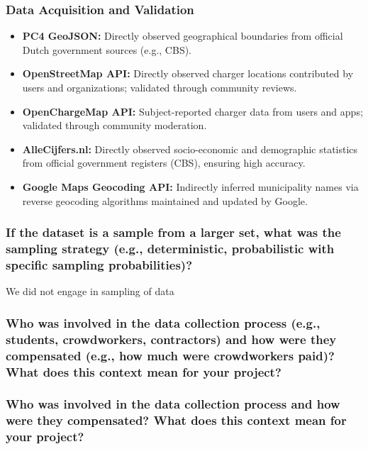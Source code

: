 \documentclass{article}
\newcommand{\question}[1]{#1}
\begin{document}
\subsubsection*{Data Acquisition and Validation}

\begin{itemize}
	\item \textbf{PC4 GeoJSON:} Directly observed geographical boundaries from official Dutch government sources (e.g., CBS).

	\item \textbf{OpenStreetMap API:} Directly observed charger locations contributed by users and organizations; validated through community reviews.

	\item \textbf{OpenChargeMap API:} Subject-reported charger data from users and apps; validated through community moderation.

	\item \textbf{AlleCijfers.nl:} Directly observed socio-economic and demographic statistics from official government registers (CBS), ensuring high accuracy.

	\item \textbf{Google Maps Geocoding API:} Indirectly inferred municipality names via reverse geocoding algorithms maintained and updated by Google.
\end{itemize}

\question{\subsubsection*{If the dataset is a sample from a larger set, what was the sampling strategy (e.g., deterministic, probabilistic with specific sampling probabilities)?}}
We did not engage in sampling of data

\question{\subsubsection*{Who was involved in the data collection process (e.g., students,
		crowdworkers, contractors) and how were they compensated (e.g.,
		how much were crowdworkers paid)? What does this context mean for your project?}}
\subsubsection*{Who was involved in the data collection process and how were they compensated? What does this context mean for your project?}
\end{document}
